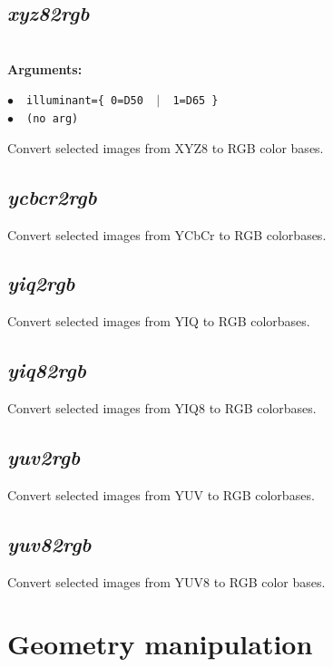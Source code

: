 \documentclass[a4paper,10.5pt,twoside]{book}
\newcommand{\Cb}[1]{\textcolor{cb}{#1}}
\begin{document}
\subsection{\emph{xyz82rgb} }\vspace*{-0.7em}
~\\\textbf{\Cb{Arguments: }}\begin{flushleft}
{\small \Cb{\hspace*{0.5cm}$\bullet$~~\texttt{illuminant=\{ 0=D50 ~$|$~ 1=D65 \}}}}~~~\\
{\small \Cb{\hspace*{0.5cm}$\bullet$~~\texttt{(no arg)}}}\end{flushleft}
Convert selected images from XYZ8 to RGB color bases.


\subsection{\emph{ycbcr2rgb} }\vspace*{-0.7em}
Convert selected images from YCbCr to RGB colorbases.


\subsection{\emph{yiq2rgb} }\vspace*{-0.7em}
Convert selected images from YIQ to RGB colorbases.


\subsection{\emph{yiq82rgb} }\vspace*{-0.7em}
Convert selected images from YIQ8 to RGB colorbases.


\subsection{\emph{yuv2rgb} }\vspace*{-0.7em}
Convert selected images from YUV to RGB colorbases.


\subsection{\emph{yuv82rgb} }\vspace*{-0.7em}
Convert selected images from YUV8 to RGB color bases.

\section{Geometry manipulation}
\end{document}
